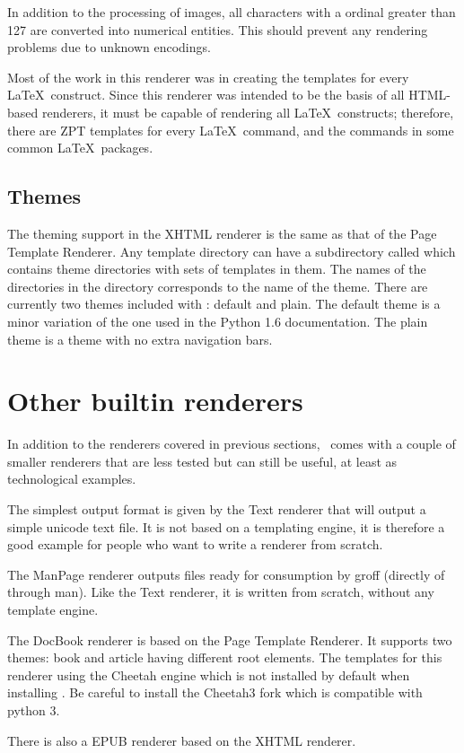 In addition to the processing of images, all characters with a ordinal
greater than 127 are converted into numerical entities.  This should
prevent any rendering problems due to unknown encodings.

Most of the work in this renderer was in creating the templates for
every \LaTeX\ construct.  Since this renderer was intended to be the
basis of all HTML-based renderers, it must be capable of rendering
all \LaTeX\ constructs; therefore, there are ZPT templates for every
\LaTeX\ command, and the commands in some common \LaTeX\ packages.

\subsection{Themes}

The theming support in the XHTML renderer is the same as that of the
Page Template Renderer.  Any template directory can have a subdirectory called
 which contains theme directories with sets of templates
in them.  The names of the directories in the  directory
corresponds to the name of the theme.  There are currently two themes
included with \plasTeX: default and plain.  The default theme is a
minor variation of the one used in the Python 1.6 documentation.  The
plain theme is a theme with no extra navigation bars.

\section{Other builtin renderers}

In addition to the renderers covered in previous sections, \plasTeX\
comes with a couple of smaller renderers that are less tested but can
still be useful, at least as technological examples.

The simplest output format is given by the Text renderer that will
output a simple unicode text file. It is not based on a templating
engine, it is therefore a good example for people who want to write
a renderer from scratch.

The ManPage renderer outputs files ready for consumption by groff
(directly of through man). Like the Text renderer, it is written
from scratch, without any template engine.

The DocBook renderer is based on the Page Template Renderer.
It supports two themes: book and article having different root elements.
The templates for this renderer using the Cheetah engine which is not
installed by default when installing \plasTeX. Be careful to install
the Cheetah3 fork which is compatible with python 3.

There is also a EPUB renderer based on the XHTML renderer.
